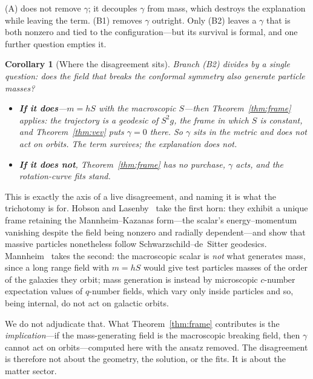 \documentclass[11pt]{article}
\newtheorem{corollary}[theorem]{Corollary}
\theoremstyle{definition}
\theoremstyle{remark}
\begin{document}
(A) does not remove \(\gamma\); it decouples \(\gamma\) from mass, which
destroys the explanation while leaving the term.  (B1) removes \(\gamma\)
outright.  Only (B2) leaves a \(\gamma\) that is both nonzero and tied to the
configuration---but its survival is formal, and one further question empties
it.

\begin{corollary}[Where the disagreement sits]
\label{cor:collapse}
Branch (B2) divides by a single question: \emph{does the field that breaks the
conformal symmetry also generate particle masses?}
\begin{itemize}\itemsep2pt
\item \textbf{If it does}---\(m=hS\) with the macroscopic \(S\)---then
  Theorem~\ref{thm:frame} applies: the trajectory is a geodesic of
  \(S^{2}g\), the frame in which \(S\) is constant, and
  Theorem~\ref{thm:vev} puts \(\gamma=0\) there.  So \(\gamma\) sits in the
  metric and \emph{does not act on orbits}.  The term survives; the
  explanation does not.
\item \textbf{If it does not}, Theorem~\ref{thm:frame} has no purchase,
  \(\gamma\) acts, and the rotation-curve fits stand.
\end{itemize}
\end{corollary}

This is exactly the axis of a live disagreement, and naming it is what the
trichotomy is for.  Hobson and Lasenby~\cite{HobsonLasenby2021} take the first
horn: they exhibit a unique frame retaining the Mannheim--Kazanas form---the
scalar's energy--momentum vanishing despite the field being nonzero and
radially dependent---and show that massive particles nonetheless follow
Schwarzschild--de~Sitter geodesics.  Mannheim~\cite{Mannheim2022} takes the
second: the macroscopic scalar is \emph{not} what generates mass, since a long
range field with \(m=hS\) would give test particles masses of the order of the
galaxies they orbit; mass generation is instead by microscopic
\(c\)-number expectation values of \(q\)-number fields, which vary only
inside particles and so, being internal, do not act on galactic orbits.

We do not adjudicate that.  What Theorem~\ref{thm:frame} contributes is the
\emph{implication}---if the mass-generating field is the macroscopic breaking
field, then \(\gamma\) cannot act on orbits---computed here with the ansatz
removed.  The disagreement is therefore not about the geometry, the solution,
or the fits.  It is about the matter sector.
\end{document}
